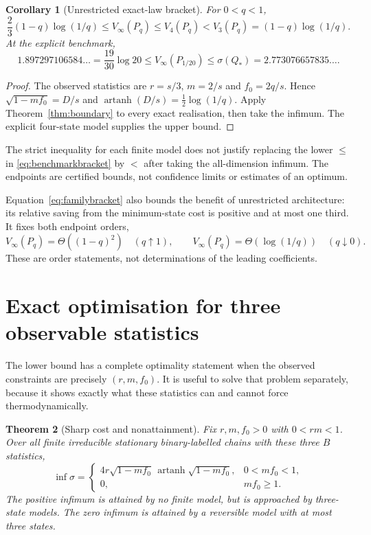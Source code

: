 \documentclass[11pt,a4paper]{article}
\newtheorem{theorem}{Theorem}
\newtheorem{corollary}[theorem]{Corollary}
\theoremstyle{remark}\newtheorem{remark}[theorem]{Remark}
\newcommand{\atanh}{\operatorname{artanh}}
\begin{document}
\begin{corollary}[Unrestricted exact-law bracket]\label{cor:bracket}
For $0<q<1$,
\begin{equation}\label{eq:familybracket}
 \frac23(1-q)\log(1/q)\leq V_\infty(P_q)
 \leq V_4(P_q)<V_3(P_q)=(1-q)\log(1/q).
\end{equation}
At the explicit benchmark,
\begin{equation}\label{eq:benchmarkbracket}
 1.897297106584\ldots
 =\frac{19}{30}\log20
 \leq V_\infty(P_{1/20})
 \leq\sigma(Q_*)=2.773076657835\ldots.
\end{equation}
\end{corollary}
\begin{proof}
The observed statistics are $r=s/3$, $m=2/s$ and $f_0=2q/s$.
Hence $\sqrt{1-mf_0}=D/s$ and $\atanh(D/s)=\tfrac12\log(1/q)$.
Apply Theorem~\ref{thm:boundary} to every exact realisation, then take the
infimum. The explicit four-state model supplies the upper bound.
\end{proof}
The strict inequality for each finite model does not justify replacing the
lower $\leq$ in \eqref{eq:benchmarkbracket} by $<$ after taking the
all-dimension infimum. The endpoints are certified bounds, not confidence
limits or estimates of an optimum.

Equation~\eqref{eq:familybracket} also bounds the benefit of unrestricted
architecture: its relative saving from the minimum-state cost is positive
and at most one third. It fixes both endpoint orders,
\begin{equation}\label{eq:asymptoticorders}
 V_\infty(P_q)=\Theta((1-q)^2)\quad(q\uparrow1),\qquad
 V_\infty(P_q)=\Theta(\log(1/q))\quad(q\downarrow0).
\end{equation}
These are order statements, not determinations of the leading coefficients.

\section{Exact optimisation for three observable statistics}
\label{sec:statistics}

The lower bound has a complete optimality statement when the observed
constraints are precisely $(r,m,f_0)$. It is useful to solve that problem
separately, because it shows exactly what these statistics can and cannot
force thermodynamically.

\begin{theorem}[Sharp cost and nonattainment]\label{thm:statistics}
Fix $r,m,f_0>0$ with $0<rm<1$. Over all finite irreducible stationary
binary-labelled chains with these three $B$ statistics,
\begin{equation}\label{eq:statinf}
 \inf\sigma=
 \begin{cases}
 4r\sqrt{1-mf_0}\,\atanh\sqrt{1-mf_0},&0<mf_0<1,\\
 0,&mf_0\geq1.
 \end{cases}
\end{equation}
The positive infimum is attained by no finite model, but is approached by
three-state models. The zero infimum is attained by a reversible model with
at most three states.
\end{theorem}
\end{document}
